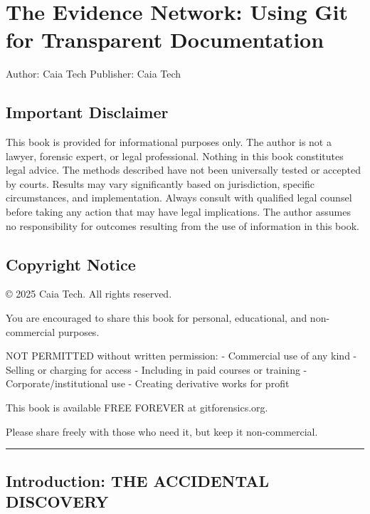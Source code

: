 \chapter{The Evidence Network: Using Git for Transparent
Documentation}\label{the-evidence-network-using-git-for-transparent-documentation}

Author: Caia Tech Publisher: Caia Tech

\section{Important Disclaimer}\label{important-disclaimer}

This book is provided for informational purposes only. The author is not
a lawyer, forensic expert, or legal professional. Nothing in this book
constitutes legal advice. The methods described have not been
universally tested or accepted by courts. Results may vary significantly
based on jurisdiction, specific circumstances, and implementation.
Always consult with qualified legal counsel before taking any action
that may have legal implications. The author assumes no responsibility
for outcomes resulting from the use of information in this book.

\section{Copyright Notice}\label{copyright-notice}

© 2025 Caia Tech. All rights reserved.

You are encouraged to share this book for personal, educational, and
non-commercial purposes.

NOT PERMITTED without written permission: - Commercial use of any kind -
Selling or charging for access - Including in paid courses or training -
Corporate/institutional use - Creating derivative works for profit

This book is available FREE FOREVER at gitforensics.org.

Please share freely with those who need it, but keep it non-commercial.

\begin{center}\rule{0.5\linewidth}{0.5pt}\end{center}

\section{Introduction: THE ACCIDENTAL
DISCOVERY}\label{introduction-the-accidental-discovery}

